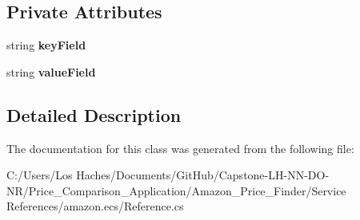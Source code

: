 \subsection*{Private Attributes}
\begin{DoxyCompactItemize}
\item 
\hypertarget{class_price___comparison_1_1amazon_1_1ecs_1_1_cart_create_request_item_meta_data_af70f0f70c5d858c112fb6f50380014c1}{string {\bfseries key\-Field}}\label{class_price___comparison_1_1amazon_1_1ecs_1_1_cart_create_request_item_meta_data_af70f0f70c5d858c112fb6f50380014c1}

\item 
\hypertarget{class_price___comparison_1_1amazon_1_1ecs_1_1_cart_create_request_item_meta_data_ab765ba412c3b264cd38fbd4e95ad843a}{string {\bfseries value\-Field}}\label{class_price___comparison_1_1amazon_1_1ecs_1_1_cart_create_request_item_meta_data_ab765ba412c3b264cd38fbd4e95ad843a}

\end{DoxyCompactItemize}


\subsection{Detailed Description}


The documentation for this class was generated from the following file\-:\begin{DoxyCompactItemize}
\item 
C\-:/\-Users/\-Los Haches/\-Documents/\-Git\-Hub/\-Capstone-\/\-L\-H-\/\-N\-N-\/\-D\-O-\/\-N\-R/\-Price\-\_\-\-Comparison\-\_\-\-Application/\-Amazon\-\_\-\-Price\-\_\-\-Finder/\-Service References/amazon.\-ecs/Reference.\-cs\end{DoxyCompactItemize}

